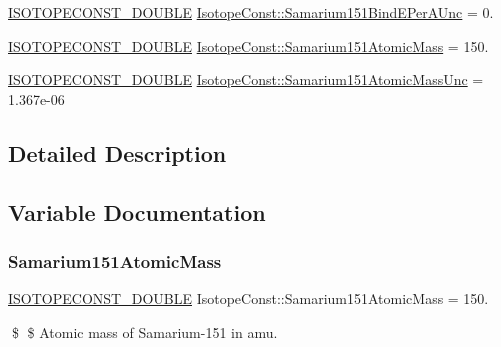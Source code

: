 \begin{DoxyCompactItemize}
\mbox{\hyperlink{group___isotope_const-_macros_ga8f45a7272ce02c0b4c65c44636ed719a}{I\+S\+O\+T\+O\+P\+E\+C\+O\+N\+S\+T\+\_\+\+D\+O\+U\+B\+LE}} \mbox{\hyperlink{group___isotope_const-_samarium-_sm151_ga5dbc64446fdb085e04f153bebd6ea154}{Isotope\+Const\+::\+Samarium151\+Bind\+E\+Per\+A\+Unc}} = 0.
\item 
\mbox{\hyperlink{group___isotope_const-_macros_ga8f45a7272ce02c0b4c65c44636ed719a}{I\+S\+O\+T\+O\+P\+E\+C\+O\+N\+S\+T\+\_\+\+D\+O\+U\+B\+LE}} \mbox{\hyperlink{group___isotope_const-_samarium-_sm151_ga14fa28defe38aabe0f3b1bcadd6e7747}{Isotope\+Const\+::\+Samarium151\+Atomic\+Mass}} = 150.
\item 
\mbox{\hyperlink{group___isotope_const-_macros_ga8f45a7272ce02c0b4c65c44636ed719a}{I\+S\+O\+T\+O\+P\+E\+C\+O\+N\+S\+T\+\_\+\+D\+O\+U\+B\+LE}} \mbox{\hyperlink{group___isotope_const-_samarium-_sm151_gac51f5cd4ca2a0dee13576da1968d749f}{Isotope\+Const\+::\+Samarium151\+Atomic\+Mass\+Unc}} = 1.\+367e-\/06
\end{DoxyCompactItemize}


\subsection{Detailed Description}


\subsection{Variable Documentation}
\mbox{\label{group___isotope_const-_samarium-_sm151_ga14fa28defe38aabe0f3b1bcadd6e7747}} 
\subsubsection{\texorpdfstring{Samarium151\+Atomic\+Mass}{Samarium151AtomicMass}}
{\footnotesize\ttfamily \mbox{\hyperlink{group___isotope_const-_macros_ga8f45a7272ce02c0b4c65c44636ed719a}{I\+S\+O\+T\+O\+P\+E\+C\+O\+N\+S\+T\+\_\+\+D\+O\+U\+B\+LE}} Isotope\+Const\+::\+Samarium151\+Atomic\+Mass = 150.}

\$ \$ Atomic mass of Samarium-\/151 in amu. \mbox{\label{group___isotope_const-_samarium-_sm151_gac51f5cd4ca2a0dee13576da1968d749f}} 
